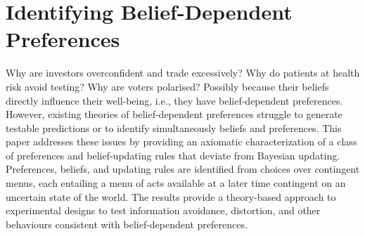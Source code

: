 \renewcommand{\thefootnote}{\fnsymbol{footnote}}

\chapter[Identifying Belief-Dependent Preferences]%
        {Identifying Belief-Dependent Preferences\protect\footnotemark}
		\label{ch:bdp}


\setcounter{footnote}{0}
\renewcommand{\thefootnote}{\arabic{footnote}}

\begin{chapterabstract}
	Why are investors overconfident and trade excessively? Why do patients at health risk avoid testing? Why are voters polarised? Possibly because their beliefs directly influence their well-being, i.e., they have belief-dependent preferences. However, existing theories of belief-dependent preferences struggle to generate testable predictions or to identify simultaneously beliefs and preferences. This paper addresses these issues by providing an axiomatic characterization of a class of preferences and belief-updating rules that deviate from Bayesian updating. Preferences, beliefs, and updating rules are identified from choices over contingent menus, each entailing a menu of acts available at a later time contingent on an uncertain state of the world. The results provide a theory-based approach to experimental designs to test information avoidance, distortion, and other behaviours consistent with belief-dependent preferences.
\end{chapterabstract}

